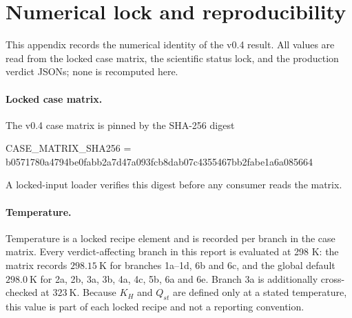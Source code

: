 \section{Numerical lock and reproducibility}\label{app:lock}

This appendix records the numerical identity of the v0.4 result. All values are read from the locked case matrix, the scientific status lock, and the production verdict JSONs; none is recomputed here.

\paragraph{Locked case matrix.} The v0.4 case matrix is pinned by the SHA-256 digest
\begin{center}\small\ttfamily
CASE\_MATRIX\_SHA256 =\\
b0571780a4794be0fabb2a7d47a093fcb8dab07c4355467bb2fabe1a6a085664
\end{center}
A locked-input loader verifies this digest before any consumer reads the matrix.

\paragraph{Temperature.} Temperature is a locked recipe element and is recorded per branch in the case matrix. Every verdict-affecting branch in this report is evaluated at 298 K: the matrix records \(298.15\ \mathrm{K}\) for branches 1a--1d, 6b and 6c, and the global default \(298.0\ \mathrm{K}\) for 2a, 2b, 3a, 3b, 4a, 4c, 5b, 6a and 6e. Branch 3a is additionally cross-checked at \(323\ \mathrm{K}\). Because \(K_H\) and \(Q_{st}\) are defined only at a stated temperature, this value is part of each locked recipe and not a reporting convention.

